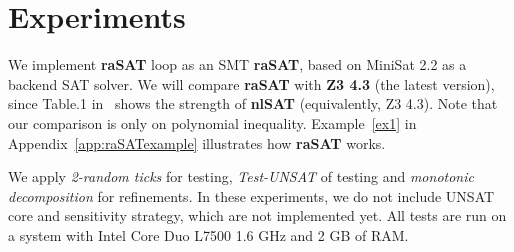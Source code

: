 \documentclass[runningheads,a4paper,oribibl]{llncs}
\newcommand{\suppress}[1]{} %
\begin{document}
\section{Experiments} \label{sec:experiment}

We implement \textbf{raSAT} loop as an SMT {\bf raSAT}, 
based on MiniSat 2.2 as a backend SAT solver. 
We will compare {\bf raSAT} with \textbf{Z3 4.3} (the latest version), 
since Table.1 in~\cite{Jovanovic13} shows the strength of \textbf{nlSAT}
(equivalently, Z3 4.3). 
Note that our comparison is only on polynomial inequality. 
Example~\ref{ex1} in Appendix~\ref{app:raSATexample} illustrates how {\bf raSAT} works. 


\suppress{
Z3 (version 3.1) is the winner of SMT competition 2011 for QF\_NRA and the 
latest version (\textbf{Z3 4.3}) is also called by another name \textbf{nlSAT} 
\cite{Jovanovic13}, which is known as a very strong SMT solver for non-linear arithmetic. 
}
We apply \emph{2-random ticks} for testing, \emph{Test-UNSAT} of testing and 
\emph{monotonic decomposition} for refinements. In these experiments, 
we do not include UNSAT core and sensitivity strategy, which are not implemented yet. 
All tests are run on a system with Intel Core Duo L7500 1.6 GHz and 2 GB of RAM.

\suppress{
It chooses a combination of input ranges for all variables, which is first evaluated by IA. 
If IA informs IA-UNSAT, \emph{very lazy theory learning rule} is applied
and it chooses another combination of input ranges. 
If IA informs IA-VALID, {\bf raSAT} terminates and outputs SAT. Otherwise, testing is applied. 

Testing generates test data from a given combination of input ranges. 
Testing will stop when it results Test-SAT, i.e., a SAT solution is found, or 
it finds the set of Test-UNSAT APIs. 
They are sent to \emph{interval decomposition} and a refinement rule is applied. 

If all input ranges become small enough, heuristic rule is applied. 
Once heuristic rules are used, {\bf raSAT} concludes \emph{unknown} when the SAT solver 
informs UNSAT. 
If they are never used, {\bf raSAT} concludes UNSAT when the same occurs. 
We apply various \emph{affine intervals} for IA and \emph{k-random ticks} for testing. 

\begin{figure}
\centering
  \texttt{[image: framework.eps]}
\caption{Framework of the SMT solver \textbf{raSAT}}
\label{fig:frame}
\end{figure}
}
\end{document}
